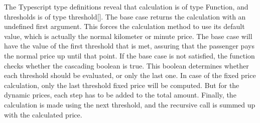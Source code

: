 The Typescript type definitions reveal that calculation is of type Function, and thresholds is of type threshold[]. The base case returns the calculation with an undefined first argument. This forces the calculation method to use its default value, which is actually the normal kilometer or minute price. The base case will have the value of the first threshold that is met, assuring that the passenger pays the normal price up until that point. If the base case is not satisfied, the function checks whether the cascading boolean is true. This boolean determines whether each threshold should be evaluated, or only the last one. In case of the fixed price calculation, only the last threshold fixed price will be computed. But for the dynamic prices, each step has to be added to the total amount. Finally, the calculation is made using the next threshold,  and the recursive call is summed up with the calculated price.

%
